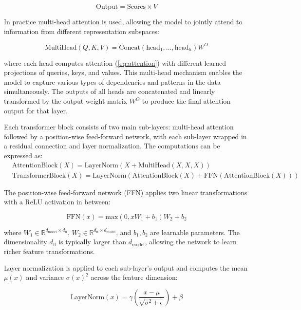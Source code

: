 \begin{equation}
\text{Output} = \text{Scores} \times V
\end{equation}

In practice multi-head attention is used, allowing the model to jointly attend to information from different representation subspaces:

\begin{equation}
\text{MultiHead}(Q, K, V) = \text{Concat}(\text{head}_1, \ldots, \text{head}_h)W^O
\end{equation}

where each head computes attention (\ref{eq:attention}) with different learned projections of queries, keys, and values. This multi-head mechanism enables the model to capture various types of dependencies and patterns in the data simultaneously. The outputs of all heads are concatenated and linearly transformed by the output weight matrix $W^O$ to produce the final attention output for that layer.

Each transformer block consists of two main sub-layers: multi-head attention followed by a position-wise feed-forward network, with each sub-layer wrapped in a residual connection and layer normalization. The computations can be expressed as:
\begin{align}
& \text{AttentionBlock}(X) = \text{LayerNorm}(X + \text{MultiHead}(X, X, X)) \\
& \text{TransformerBlock}(X) = \text{LayerNorm}(\text{AttentionBlock}(X) + \text{FFN}(\text{AttentionBlock}(X)))
\end{align}

The position-wise feed-forward network (FFN) applies two linear transformations with a ReLU activation in between:

\begin{equation}
\text{FFN}(x) = \text{max}(0, xW_1 + b_1)W_2 + b_2
\end{equation}

where $W_1 \in \mathbb{R}^{d_{\text{model}} \times d_{\text{ff}}}$, $W_2 \in \mathbb{R}^{d_{\text{ff}} \times d_{\text{model}}}$, and $b_1, b_2$ are learnable parameters. The dimensionality $d_{\text{ff}}$ is typically larger than $d_{\text{model}}$, allowing the network to learn richer feature transformations.

Layer normalization is applied to each sub-layer's output and computes the mean $\mu(x)$ and variance $\sigma(x)^2$ across the feature dimension:

\begin{equation}
\text{LayerNorm}(x) = \gamma \left(\frac{x - \mu}{\sqrt{\sigma^2 + \epsilon}}\right) + \beta
\end{equation}

